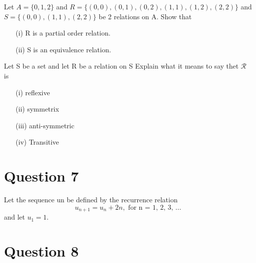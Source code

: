 \documentclass[]{report}
\begin{document}
Let $A=\{0,1,2\}$ and $R=\{ (0,0),(0,1),(0,2),(1,1), (1,2), (2,2)\}$
and $S=\{(0,0),(1,1),(2,2)\}$ be 2 relations on A. Show that

\begin{itemize}
	\item[(i)] R is a partial order relation.
	\item[(ii)] S is an equivalence relation.
\end{itemize}

Let S be a set and let R be a relation on S
Explain what it means to say thet $\mathcal{R}$ is

\begin{itemize}
	\item[(i)] reflexive
	\item[(ii)] symmetrix
	\item[(iii)] anti-symmetric
	\item[(iv)] Transitive
	
	
	
\end{itemize}


\section*{Question 7}
Let the sequence un be defined by the recurrence relation
\[u_{n+1} = u_n + 2n, \mbox{ for n = 1, 2, 3, ...}\]
and let $u_1 = 1$.\\

\newpage
\section*{Question 8}

\end{document}
